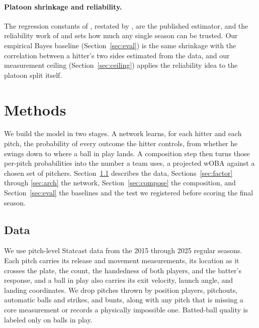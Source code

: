 \documentclass[11pt,letterpaper]{article}
\begin{document}
\paragraph{Platoon shrinkage and reliability.} The regression constants of \citet{tango2007}, restated by \citet{klaassen2010}, are the published estimator, and the reliability work of \citet{carleton2017} and \citet{pemstein2016} sets how much any single season can be trusted. Our empirical Bayes baseline (Section~\ref{sec:eval}) is the same shrinkage with the correlation between a hitter's two sides estimated from the data, and our measurement ceiling (Section~\ref{sec:ceiling}) applies the reliability idea to the platoon split itself.

\section{Methods}
\label{sec:methods}

We build the model in two stages. A network learns, for each hitter and each pitch, the probability of every outcome the hitter controls, from whether he swings down to where a ball in play lands. A composition step then turns those per-pitch probabilities into the number a team uses, a projected wOBA against a chosen set of pitchers. Section~\ref{sec:data} describes the data, Sections~\ref{sec:factor} through \ref{sec:arch} the network, Section~\ref{sec:compose} the composition, and Section~\ref{sec:eval} the baselines and the test we registered before scoring the final season.

\subsection{Data}
\label{sec:data}

We use pitch-level Statcast data from the 2015 through 2025 regular seasons. Each pitch carries its release and movement measurements, its location as it crosses the plate, the count, the handedness of both players, and the batter's response, and a ball in play also carries its exit velocity, launch angle, and landing coordinates. We drop pitches thrown by position players, pitchouts, automatic balls and strikes, and bunts, along with any pitch that is missing a core measurement or records a physically impossible one. Batted-ball quality is labeled only on balls in play.
\end{document}
